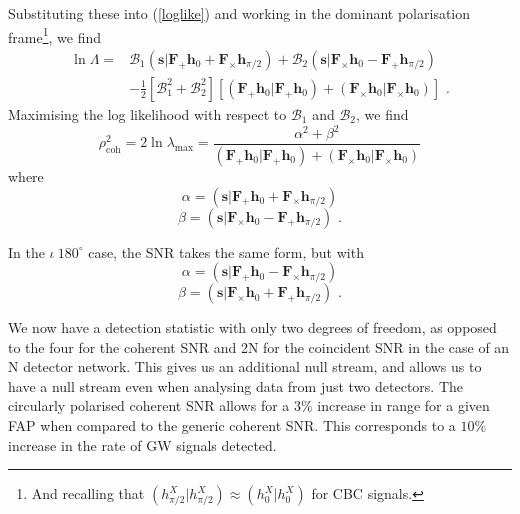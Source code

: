 \documentclass[11pt]{cuthesis}
\newcommand{\fs}{\text{ .}}
\begin{document}
Substituting these into (\ref{loglike}) and working in the dominant polarisation frame\footnote{And recalling that $(h_{\pi/2}^X|h_{\pi/2}^X)\approx (h_0^X|h_0^X)$ for CBC signals.}, we find
\begin{align} 
\ln \Lambda = & \mathcal{B}_1 (\textbf{s}|\textbf{F}_+\textbf{h}_0 + \textbf{F}_\times \textbf{h}_{\pi /2} ) + \mathcal{B}_2  (\textbf{s}|\textbf{F}_\times\textbf{h}_0 - \textbf{F}_+ \textbf{h}_{\pi /2} ) \\ & - \frac{1}{2} [\mathcal{B}_1^2 + \mathcal{B}_2^2 ] [ (\textbf{F}_+\textbf{h}_0|\textbf{F}_+\textbf{h}_0) + (\textbf{F}_\times \textbf{h}_0|\textbf{F}_\times \textbf{h}_0) ] \fs
\end{align}
Maximising the log likelihood with respect to $\mathcal{B}_1$ and $\mathcal{B}_2$, we find 
\begin{equation}
\rho_\text{coh}^2 = 2\ln \lambda_\text{max} = \frac{\alpha^2 + \beta^2}{ (\textbf{F}_+\textbf{h}_0|\textbf{F}_+\textbf{h}_0) + (\textbf{F}_\times \textbf{h}_0|\textbf{F}_\times \textbf{h}_0)}
\end{equation}
where
\begin{equation}
\alpha = (\textbf{s}|\textbf{F}_+\textbf{h}_0 + \textbf{F}_\times \textbf{h}_{\pi /2} )
\end{equation}
\begin{equation}
\beta =  (\textbf{s}|\textbf{F}_\times\textbf{h}_0 - \textbf{F}_+ \textbf{h}_{\pi /2} ) \fs
\end{equation}

In the $\iota~180^\circ$ case, the SNR takes the same form, but with
\begin{equation}
\alpha = (\textbf{s}|\textbf{F}_+\textbf{h}_0 - \textbf{F}_\times \textbf{h}_{\pi /2} )
\end{equation}
\begin{equation}
\beta =  (\textbf{s}|\textbf{F}_\times\textbf{h}_0 + \textbf{F}_+ \textbf{h}_{\pi /2} ) \fs
\end{equation}

We now have a detection statistic with only two degrees of freedom, as opposed to the four for the coherent SNR and 2N for the coincident SNR in the case of an N detector network. This gives us an additional null stream, and allows us to have a null stream even when analysing data from just two detectors. The circularly polarised coherent SNR allows for a $3\%$ increase in range for a given FAP when compared to the generic coherent SNR. This corresponds to a $10\%$ increase in the rate of GW signals detected.
\end{document}
